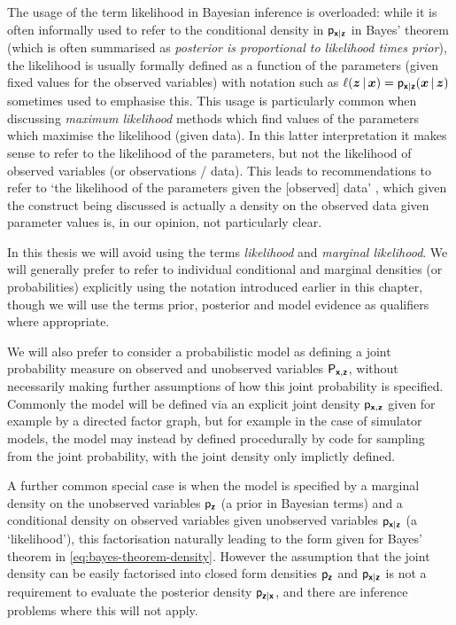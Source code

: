 The usage of the term likelihood in Bayesian inference is overloaded: while it is often informally used to refer to the conditional density in $\mathsf{p}_{\boldsymbol{\mathsf{x}}|\boldsymbol{\mathsf{z}}}$ in Bayes' theorem (which is often summarised as \emph{posterior is proportional to likelihood times prior}), the likelihood is usually formally defined as a function of the parameters (given fixed values for the observed variables) with notation such as $\ell(\boldsymbol{z} \operatorname{|} \boldsymbol{x}) = \mathsf{p}_{\boldsymbol{\mathsf{x}}|\boldsymbol{\mathsf{z}}}(\boldsymbol{x}\operatorname{|}\boldsymbol{z})$ sometimes used to emphasise this. This usage is particularly common when discussing \emph{maximum likelihood} methods which find values of the parameters which maximise the likelihood (given data). In this latter interpretation it makes sense to refer to the likelihood of the parameters, but not the likelihood of observed variables (or observations / data). This leads to recommendations to refer to `the likelihood of the parameters given the [observed] data' \citep{mackay2003information}, which given the construct being discussed is actually a density on the observed data given parameter values is, in our opinion, not particularly clear.

In this thesis we will avoid using the terms \emph{likelihood} and \emph{marginal likelihood}. We will generally prefer to refer to individual conditional and marginal densities (or probabilities) explicitly using the notation introduced earlier in this chapter, though we will use the terms prior, posterior and model evidence as qualifiers where appropriate.%

We will also prefer to consider a probabilistic model as defining a joint probability measure on observed and unobserved variables $\mathsf{P}_{\boldsymbol{\mathsf{x}},\boldsymbol{\mathsf{z}}}$, without necessarily making further assumptions of how this joint probability is specified. Commonly the model will be defined via an explicit joint density $\mathsf{p}_{\boldsymbol{\mathsf{x}},\boldsymbol{\mathsf{z}}}$ given for example by a directed factor graph, but for example in the case of simulator models, the model may instead by defined procedurally by code for sampling from the joint probability, with the joint density only implictly defined. 

A further common special case is when the model is specified by a marginal density on the unobserved variables $\mathsf{p}_{\boldsymbol{\mathsf{z}}}$ (a prior in Bayesian terms) and a conditional density on observed variables given unobserved variables $\mathsf{p}_{\boldsymbol{\mathsf{x}}|\boldsymbol{\mathsf{z}}}$ (a `likelihood'), this factorisation naturally leading to the form given for Bayes' theorem in \eqref{eq:bayes-theorem-density}. However the assumption that the joint density can be easily factorised into closed form densities $\mathsf{p}_{\boldsymbol{\mathsf{z}}}$ and $\mathsf{p}_{\boldsymbol{\mathsf{x}}|\boldsymbol{\mathsf{z}}}$ is not a requirement to evaluate the posterior density $\mathsf{p}_{\boldsymbol{\mathsf{z}}|\boldsymbol{\mathsf{x}}}$, and there are inference problems where this will not apply.

